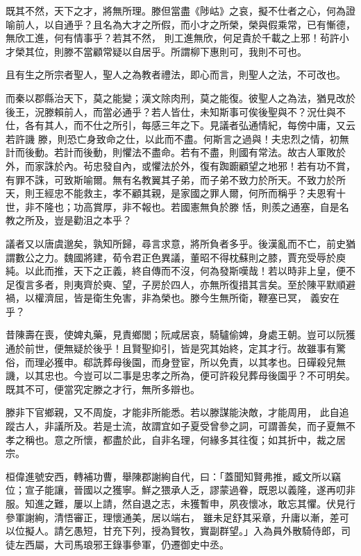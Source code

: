 \begin{pinyinscope}
 既其不然，天下之才，將無所理。滕但當盡《陟岵》之哀，擬不仕者之心，何為證喻前人，以自通乎？且名為大才之所假，而小才之所榮，榮與假乘常，已有慚德，無欣工進，何有情事乎？若其不然，
 則工進無欣，何足貴於千載之上邪！茍許小才榮其位，則滕不當顧常疑以自居乎。所謂柳下惠則可，我則不可也。



 且有生之所宗者聖人，聖人之為教者禮法，即心而言，則聖人之法，不可改也。



 而秦以郡縣治天下，莫之能變；漢文除肉刑，莫之能復。彼聖人之為法，猶見改於後王，況滕賴前人，而當必通乎？若人皆仕，未知斯事可俟後聖與不？況仕與不仕，各有其人，而不仕之所引，每感三年之下。見議者弘通情紀，每傍中庸，又云若許譏
 滕，則恐亡身致命之仕，以此而不盡。何斯言之過與！夫忠烈之情，初無計而後動。若計而後動，則懼法不盡命。若有不盡，則國有常法。故古人軍敗於外，而家誅於內。茍忠發自內，或懼法於外，復有踟躕顧望之地邪！若有功不賞，有罪不誅，可致斯喻爾。無有名教翼其子弟，而子弟不致力於所天。不致力於所天，則王經忠不能救主，孝不顧其親，是家國之罪人爾，何所而稱乎？夫恩宥十世，非不隆也；功高賞厚，非不報也。若國憲無負於滕
 恬，則羨之通塞，自是名教之所及，豈是勸沮之本乎？



 議者又以唐虞邈矣，孰知所歸，尋言求意，將所負者多乎。後漢亂而不亡，前史猶謂數公之力。魏國將建，荀令君正色異議，董昭不得枕蘇則之膝，賈充受辱於庾純。以此而推，天下之正義，終自傳而不沒，何為發斯嘆哉！若以時非上皇，便不足復言多者，則夷齊於奭、望，子房於四人，亦無所復措其言矣。至於陳平默順避禍，以權濟屈，皆是衛生免害，非為榮也。滕今生無所衛，鞭塞已冥，
 義安在乎？



 昔陳壽在喪，使婢丸藥，見責鄉閭；阮咸居哀，騎驢偷婢，身處王朝。豈可以阮獲通於前世，便無疑於後乎！且賢聖抑引，皆是究其始終，定其才行。故雖事有驚俗，而理必獲申。郗詵葬母後園，而身登宦，所以免責，以其孝也。日磾殺兒無譏，以其忠也。今豈可以二事是忠孝之所為，便可許殺兒葬母後園乎？不可明矣。既其不可，便當究定滕之才行，無所多辯也。



 滕非下官鄉親，又不周旋，才能非所能悉。若以滕謀能決敵，才能周用，
 此自追蹤古人，非議所及。若是士流，故謂宜如子夏受曾參之詞，可謂善矣，而子夏無不孝之稱也。意之所懷，都盡於此，自非名理，何緣多其往復；如其折中，裁之居宗。



 桓偉進號安西，轉補功曹，舉陳郡謝絢自代，曰：「蓋聞知賢弗推，臧文所以竊位；宣子能讓，晉國以之獲寧。鮮之猥承人乏，謬蒙過眷，既恩以義隆，遂再叨非服。知進之難，屢以上請，然自退之志，未獲暫申，夙夜懷冰，敢忘其懼。伏見行參軍謝絢，清悟審正，理懷通美，居以端右，
 雖未足舒其采章，升庸以漸，差可以位擬人。請乞愚短，甘充下列，授為賢牧，實副群望。」入為員外散騎侍郎，司徒左西屬，大司馬琅邪王錄事參軍，仍遷御史中丞。




\end{pinyinscope}
